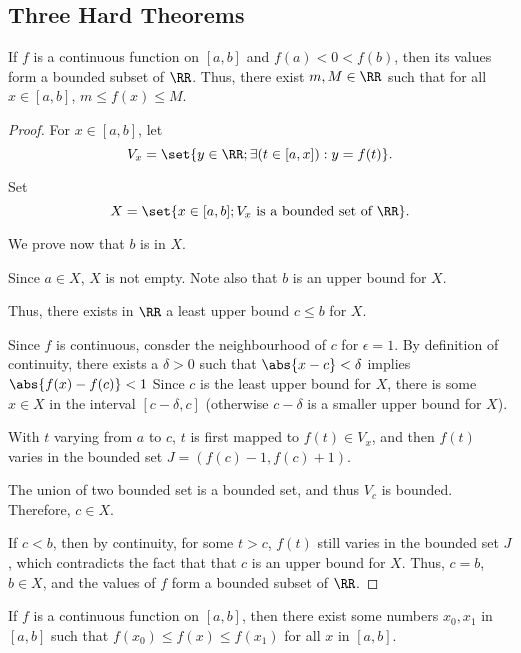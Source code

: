 \documentclass[11pt]{scrartcl}
\begin{document}
\subsection{Three Hard Theorems}
\label{subsec:tht}
\begin{theorem}
  \label{thm:bounded}
  If \(f\) is a continuous function on \([a,b]\) and \(f(a)<0<f(b)\), then its
  values form a bounded subset of \(\RR\). Thus, there exist
  \(m,M\in\RR\) such that for all \(x\in[a,b]\), \(m\leq f(x)\leq M\).
\end{theorem}
\begin{proof}
  For \(x \in [a,b]\), let
  \[V_{x}=\set{y\in\RR ; \exists (t\in[a,x]):y = f(t)}.\]

  Set \[X=\set{x\in[a,b];V_{x}\text{\ is a bounded set of\ }\RR }.\]

  We prove now that \(b\) is in \(X\).\vs

  Since \(a\in X\), \(X\) is not empty. Note also that \(b\) is an
  upper bound for \(X\).

  Thus, there exists in \(\RR\) a least upper bound \(c \leq b\) for
  \(X\). \vs

  Since \(f\) is continuous, consder the neighbourhood of \(c\) for
  \(\epsilon = 1\). By definition of continuity, there exists a
  \(\delta > 0\) such that \(\abs{x-c}<\delta\) implies
  \(\abs{f(x) - f(c)}<1\) Since \(c\) is the least upper bound for
  \(X\), there is some \(x\in X\) in the interval \([c-\delta, c]\)
  (otherwise \(c-\delta\) is a smaller upper bound for \(X\)). \vs

  With \(t\) varying from \(a\) to \(c\), \(t\) is first mapped to
  \(f(t)\in V_{x}\), and then \(f(t)\) varies in the bounded set
  \(J = (f(c)-1, f(c)+1)\). \vs

  The union of two bounded set is a bounded set, and thus \(V_{c}\)
  is bounded. Therefore, \(c\in X\). \vs

  If \(c<b\), then by continuity, for some \(t>c\), \(f(t)\) still
  varies in the bounded set \(J\), which contradicts the fact that
  that \(c\) is an upper bound for \(X\). Thus, \(c=b\), \(b \in X\),
  and the values of \(f\) form a bounded subset of \(\RR\).
\end{proof}
\begin{theorem}
  If \(f\) is a continuous function on \([a,b]\), then there exist
  some numbers \(x_{0}, x_{1}\) in \([a,b]\) such that
  \(f(x_{0})\leq f(x)\leq f(x_{1})\) for all \(x\) in \([a,b]\).
\end{theorem}
\end{document}
